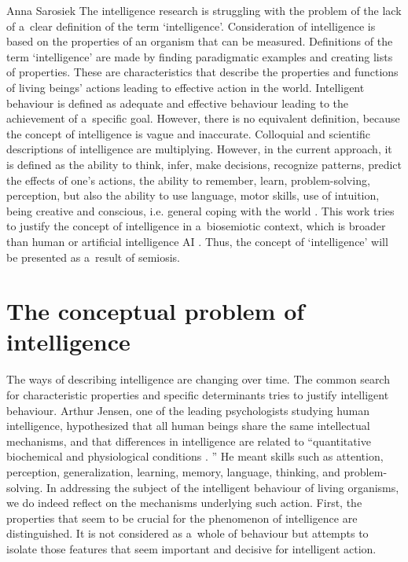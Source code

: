 \begin{artengenv}{Anna Sarosiek}
The intelligence research is struggling with the problem of the lack of a~clear definition of the term ‘intelligence’. Consideration of intelligence is based on the properties of an organism that can be measured. Definitions of the term ‘intelligence’ are made by finding paradigmatic examples and creating lists of properties. These are characteristics that describe the properties and functions of living beings’ actions leading to effective action in the world. Intelligent behaviour is defined as adequate and effective behaviour leading to the achievement of a~specific goal. However, there is no equivalent definition, because the concept of intelligence is vague and inaccurate. Colloquial and scientific descriptions of intelligence are multiplying. However, in the current approach, it is defined as the ability to think, infer, make decisions, recognize patterns, predict the effects of one’s actions, the ability to remember, learn, problem-solving, perception, but also the ability to use language, motor skills, use of intuition, being creative and conscious, i.e. general coping with the world
\parencite[][]{rosen_fundamentals_1978}. %
 This work tries to justify the concept of intelligence in a~biosemiotic context, which is broader than human
\parencites[][]{byrne_2004}[][]{goldstein_2015}[][]{pfeifer_2006}[][]{spearman_1904}[][]{thorndike_animal_2017} %
 or artificial intelligence AI 
\parencites[][]{brooks_1986}[][]{kurzweil_1990}. %
Thus, the concept of ‘intelligence’ will be presented as a~result of semiosis.

\section*{The conceptual problem of intelligence}
The ways of describing intelligence are changing over time. The common search for characteristic properties and specific determinants tries to justify intelligent behaviour. Arthur Jensen, one of the leading psychologists studying human intelligence, hypothesized that all human beings share the same intellectual mechanisms, and that differences in intelligence are related to ``quantitative biochemical and physiological conditions
\parencite[][]{hoffmeyer_unfolding_1998}.%
'' He meant skills such as attention, perception, generalization, learning, memory, language, thinking, and problem-solving. In addressing the subject of the intelligent behaviour of living organisms, we do indeed reflect on the mechanisms underlying such action. First, the properties that seem to be crucial for the phenomenon of intelligence are distinguished. It is not considered as a~whole of behaviour but attempts to isolate those features that seem important and decisive for intelligent action.


\end{artengenv}
